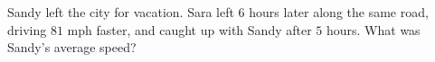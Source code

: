 Sandy left the city for vacation. Sara left $6$ hours later along the same road, driving $81$ mph faster, and caught up with Sandy after $5$ hours. What was Sandy's average speed?
